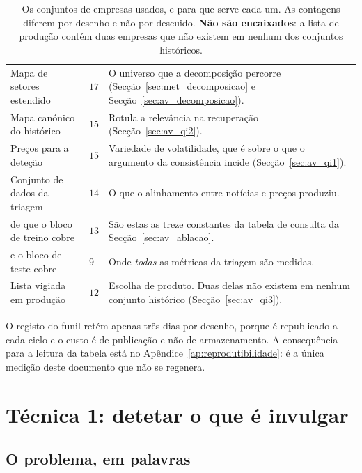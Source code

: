 \begin{table}[!htbp]
\caption[Os cinco conjuntos de empresas]{Os conjuntos de empresas usados, e para que serve cada
um. As contagens diferem por desenho e não por descuido. \textbf{Não são encaixados}: a lista de
produção contém duas empresas que não existem em nenhum dos conjuntos históricos.}
\label{tab:met_universos}
\centering
\small
\begin{tabular}{L{0.28\textwidth} C{0.08\textwidth} L{0.50\textwidth}}
\toprule
{} &  &  \\
\midrule
Mapa de setores estendido & $17$ & O universo que a decomposição percorre
  (Secção~\ref{sec:met_decomposicao} e Secção~\ref{sec:av_decomposicao}). \\
Mapa canónico do histórico & $15$ & Rotula a relevância na recuperação
  (Secção~\ref{sec:av_qi2}). \\
Preços para a deteção & $15$ & Variedade de volatilidade, que é sobre o que o argumento da
  consistência incide (Secção~\ref{sec:av_qi1}). \\
Conjunto de dados da triagem & $14$ & O que o alinhamento entre notícias e preços produziu. \\
\quad de que o bloco de treino cobre & $13$ & São estas as treze constantes da tabela de consulta
  da Secção~\ref{sec:av_ablacao}. \\
\quad e o bloco de teste cobre & $9$ & Onde \emph{todas} as métricas da triagem são medidas. \\
\midrule
Lista vigiada em produção & $12$ & Escolha de produto. Duas delas não existem em nenhum conjunto
  histórico (Secção~\ref{sec:av_qi3}). \\
\bottomrule
\end{tabular}
\end{table}

O registo do funil retém apenas três dias por desenho, porque é republicado a cada ciclo e o custo
é de publicação e não de armazenamento. A consequência para a leitura da tabela está no
Apêndice~\ref{ap:reprodutibilidade}: é a única medição deste documento que não se regenera.

\section{Técnica 1: detetar o que é invulgar}
\label{sec:met_zscore}

\subsection{O problema, em palavras}


